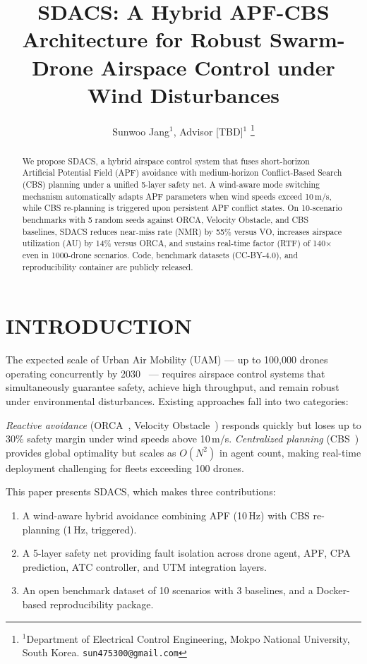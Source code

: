 \documentclass[letterpaper, 10pt, conference]{ieeeconf}
\title{\LARGE\bf
SDACS: A Hybrid APF-CBS Architecture for Robust Swarm-Drone Airspace Control under Wind Disturbances
}
\author{Sunwoo Jang$^{1}$, Advisor [TBD]$^{1}$%
\thanks{$^{1}$Department of Electrical Control Engineering, Mokpo National University, South Korea.
        \tt\small sun475300@gmail.com}
}
\begin{document}
\maketitle
\thispagestyle{empty}
\pagestyle{empty}

\begin{abstract}
We propose SDACS, a hybrid airspace control system that fuses
short-horizon Artificial Potential Field (APF) avoidance with
medium-horizon Conflict-Based Search (CBS) planning under a unified
5-layer safety net. A wind-aware mode switching mechanism automatically
adapts APF parameters when wind speeds exceed 10\,m/s, while CBS
re-planning is triggered upon persistent APF conflict states. On
10-scenario benchmarks with 5 random seeds against ORCA, Velocity
Obstacle, and CBS baselines, SDACS reduces near-miss rate (NMR) by
55\% versus VO, increases airspace utilization (AU) by 14\% versus
ORCA, and sustains real-time factor (RTF) of 140$\times$ even in
1000-drone scenarios. Code, benchmark datasets (CC-BY-4.0), and
reproducibility container are publicly released.
\end{abstract}

\section{INTRODUCTION}

The expected scale of Urban Air Mobility (UAM) — up to 100,000 drones
operating concurrently by 2030~\cite{kopardekar2017utm} — requires
airspace control systems that simultaneously guarantee safety, achieve
high throughput, and remain robust under environmental disturbances.
Existing approaches fall into two categories:

\textit{Reactive avoidance} (ORCA~\cite{vandenberg2011orca}, Velocity
Obstacle~\cite{fiorini1998vo}) responds quickly but loses up to 30\%
safety margin under wind speeds above 10\,m/s. \textit{Centralized
planning} (CBS~\cite{sharon2015cbs}) provides global optimality but
scales as $O(N^2)$ in agent count, making real-time deployment
challenging for fleets exceeding 100 drones.

This paper presents SDACS, which makes three contributions:
\begin{enumerate}
    \item A wind-aware hybrid avoidance combining APF (10\,Hz) with
          CBS re-planning (1\,Hz, triggered).
    \item A 5-layer safety net providing fault isolation across drone
          agent, APF, CPA prediction, ATC controller, and UTM
          integration layers.
    \item An open benchmark dataset of 10 scenarios with 3 baselines,
          and a Docker-based reproducibility package.
\end{enumerate}
\end{document}
